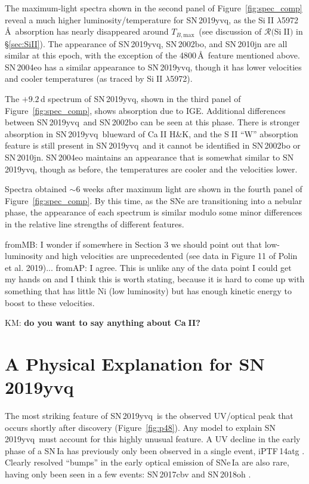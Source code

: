\documentclass[twocolumn]{aastex63}
\def\ion#1#2{#1$\;${\footnotesize\rm{#2}}\relax}
\newcommand{\kate}[1]{{\color{red} KM: \textbf{#1}}}
\newcommand{\frommb}[1]{{\color{purple} fromMB: {#1}}}
\newcommand{\fromabi}[1]{{\color{teal} fromAP: {#1}}}
\newcommand{\tbmax}{$T_{B,\mathrm{max}}$}
\newcommand{\sn}{SN\,2019yvq}
\begin{document}
The maximum-light spectra shown in the second panel of
Figure~\ref{fig:spec_comp} reveal a much higher luminosity/temperature for
\sn, as the \ion{Si}{II} $\lambda$5972\,\AA\ absorption has nearly disappeared
around \tbmax\ (see discussion of $\mathcal{R}($\ion{Si}{II}$)$ in
\S\ref{sec:SiII}). The appearance of \sn, SN\,2002bo, and SN\,2010jn are all
similar at this epoch, with the exception of the 4800\,\AA\ feature mentioned
above. SN\,2004eo has a similar appearance to \sn, though it has lower
velocities and cooler temperatures (as traced by \ion{Si}{II} $\lambda$5972).

The $+9.2$\,d spectrum of \sn, shown in the third panel of
Figure~\ref{fig:spec_comp}, shows absorption due to IGE. Additional
differences between \sn\ and SN\,2002bo can be seen at this phase. There is
stronger absorption in \sn\ blueward of \ion{Ca}{II} H\&K, and the \ion{S}{II}
``W'' absorption feature is still present in \sn\ and it cannot be identified
in SN\,2002bo or SN\,2010jn. SN\,2004eo maintains an appearance that is
somewhat similar to \sn, though as before, the temperatures are cooler and the
velocities lower.

Spectra obtained $\sim$6 weeks after maximum light are shown in the fourth
panel of Figure~\ref{fig:spec_comp}. By this time, as the SNe are
transitioning into a nebular phase, the appearance of each spectrum is similar
modulo some minor differences in the relative line strengths of different
features.

\frommb{I wonder if somewhere in Section 3 we should point out that
low-luminosity and high velocities are unprecedented (see data in Figure 11 of
Polin et al. 2019)...} \fromabi{I agree. This is unlike any of the data point
I could get my hands on and I think this is worth stating, because it is hard
to come up with something that has little Ni (low luminosity) but has enough
kinetic energy to boost to these velocities.}

\kate{do you want to say anything about \ion{Ca}{II}?}

\section{A Physical Explanation for \sn}\label{sec:models}

The most striking feature of \sn\ is the observed UV/optical peak that occurs
shortly after discovery (Figure~\ref{fig:p48}). Any model to explain \sn\ must
account for this highly unusual feature. A UV decline in the early phase of a
SN\,Ia has previously only been observed in a single event, iPTF\,14atg
\citep{Cao15}. Clearly resolved ``bumps'' in the early optical emission of
SNe\,Ia are also rare, having only been seen in a few events: SN\,2017cbv
\citep{Hosseinzadeh17} and SN\,2018oh \citep{Shappee19,Dimitriadis19}.
\end{document}
